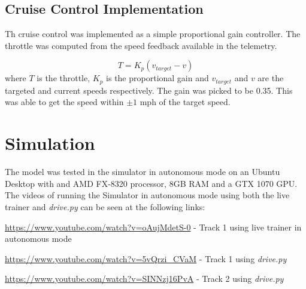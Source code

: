 \documentclass[paper=letter, fontsize=11pt]{scrartcl}
\numberwithin{equation}{section}		%
\numberwithin{figure}{section}			%
\numberwithin{table}{section}				%
\begin{document}
\subsection{Cruise Control Implementation}
Th cruise control was implemented as a simple proportional gain controller. The throttle was computed from the speed feedback available in the telemetry.

\[
T = K_p \left(v_{target} - v\right)
\]
where $T$ is the throttle, $K_p$ is the proportional gain and $v_{target}$ and $v$ are the targeted and current speeds respectively. The gain was picked to be 0.35. This was able to get the speed within $\pm 1$ mph of the target speed.

\section{Simulation}
The model was tested in the simulator in autonomous mode on an Ubuntu Desktop with and AMD FX-8320 processor, 8GB RAM and a GTX 1070 GPU. 
The videos of running the Simulator in autonomous mode using both the live trainer and \emph{drive.py} can be seen at the following links:

\href{https://www.youtube.com/watch?v=oAujMdetS-0}{https://www.youtube.com/watch?v=oAujMdetS-0} - Track 1 using live trainer in autonomous mode

\href{https://www.youtube.com/watch?v=5vQrzi_CVaM}{https://www.youtube.com/watch?v=5vQrzi\_CVaM} - Track 1 using \emph{drive.py}

\href{https://www.youtube.com/watch?v=SINNzj16PvA}{https://www.youtube.com/watch?v=SINNzj16PvA} - Track 2 using \emph{drive.py}


 
\end{document}
